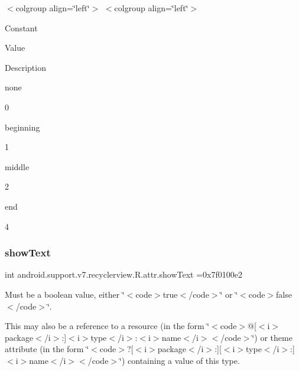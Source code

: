 \tabulinesep=1mm
\begin{longtabu} spread 0pt [c]{*{0}{|X[-1]}|}
\hline
\end{longtabu}
$<$colgroup align=\char`\"{}left\char`\"{}$>$ $<$colgroup align=\char`\"{}left\char`\"{}$>$ 

Constant

Value

Description 

{\ttfamily none}

0

{\ttfamily beginning}

1

{\ttfamily middle}

2

{\ttfamily end}

4\mbox{\label{classandroid_1_1support_1_1v7_1_1recyclerview_1_1R_1_1attr_ac396d0fc6bf6108f05b44ac0ecc38c3e}} 
\subsubsection{\texorpdfstring{show\+Text}{showText}}
{\footnotesize\ttfamily int android.\+support.\+v7.\+recyclerview.\+R.\+attr.\+show\+Text =0x7f0100e2\hspace{0.3cm}{\ttfamily [static]}}

Must be a boolean value, either \char`\"{}$<$code$>$true$<$/code$>$\char`\"{} or \char`\"{}$<$code$>$false$<$/code$>$\char`\"{}. 

This may also be a reference to a resource (in the form \char`\"{}$<$code$>$@\mbox{[}$<$i$>$package$<$/i$>$\+:\mbox{]}$<$i$>$type$<$/i$>$\+:$<$i$>$name$<$/i$>$$<$/code$>$\char`\"{}) or theme attribute (in the form \char`\"{}$<$code$>$?\mbox{[}$<$i$>$package$<$/i$>$\+:\mbox{]}\mbox{[}$<$i$>$type$<$/i$>$\+:\mbox{]}$<$i$>$name$<$/i$>$$<$/code$>$\char`\"{}) containing a value of this type. \mbox{\label{classandroid_1_1support_1_1v7_1_1recyclerview_1_1R_1_1attr_a626ebfe55aed84739afc39440a74bcb3}} 
